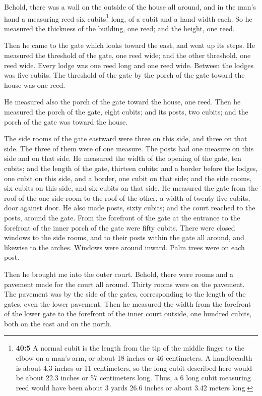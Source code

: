  Behold, there was a wall on the outside of the house all
around, and in the man's hand a measuring reed six cubits\footnote{\textbf{40:5}
  A normal cubit is the length from the tip of the middle finger to the
  elbow on a man's arm, or about 18 inches or 46 centimeters. A
  handbreadth is about 4.3 inches or 11 centimeters, so the long cubit
  described here would be about 22.3 inches or 57 centimeters long.
  Thus, a 6 long cubit measuring reed would have been about 3 yards 26.6
  inches or about 3.42 meters long.} long, of a cubit and a hand width
each. So he measured the thickness of the building, one reed; and the
height, one reed.

 Then he came to the gate which looks toward the east, and
went up its steps. He measured the threshold of the gate, one reed wide;
and the other threshold, one reed wide.  Every lodge was
one reed long and one reed wide. Between the lodges was five cubits. The
threshold of the gate by the porch of the gate toward the house was one
reed.

 He measured also the porch of the gate toward the house,
one reed.  Then he measured the porch of the gate, eight
cubits; and its posts, two cubits; and the porch of the gate was toward
the house.

 The side rooms of the gate eastward were three on this
side, and three on that side. The three of them were of one measure. The
posts had one measure on this side and on that side.  He
measured the width of the opening of the gate, ten cubits; and the
length of the gate, thirteen cubits;  and a border before
the lodges, one cubit on this side, and a border, one cubit on that
side; and the side rooms, six cubits on this side, and six cubits on
that side.  He measured the gate from the roof of the one
side room to the roof of the other, a width of twenty-five cubits, door
against door.  He also made posts, sixty cubits; and the
court reached to the posts, around the gate.  From the
forefront of the gate at the entrance to the forefront of the inner
porch of the gate were fifty cubits.  There were closed
windows to the side rooms, and to their posts within the gate all
around, and likewise to the arches. Windows were around inward. Palm
trees were on each post.

 Then he brought me into the outer court. Behold, there
were rooms and a pavement made for the court all around. Thirty rooms
were on the pavement.  The pavement was by the side of
the gates, corresponding to the length of the gates, even the lower
pavement.  Then he measured the width from the forefront
of the lower gate to the forefront of the inner court outside, one
hundred cubits, both on the east and on the north.

